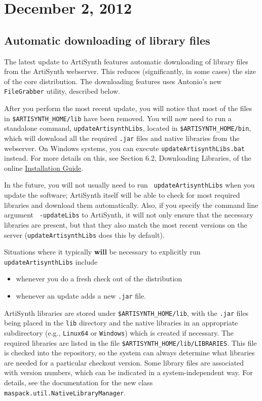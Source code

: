 \documentclass{article}
\begin{document}
\section*{December 2, 2012}

\subsection*{Automatic downloading of library files}

The latest update to ArtiSynth features automatic downloading of
library files from the ArtiSynth webserver. This reduces
(significantly, in some cases) the size of the core distribution.  The
downloading features uses Antonio's new {\tt FileGrabber} utility,
described below.

After you perform the most recent update, you will notice that most of
the files in {\tt \$ARTISYNTH\_HOME/lib} have been removed.  You will
now need to run a standalone command, {\tt updateArtisynthLibs},
located in {\tt \$ARTISYNTH\_HOME/bin}, which will download all the
required {\tt .jar} files and native libraries from the webserver. On
Windows systems, you can execute {\tt updateArtisynthLibs.bat}
instead. For more details on this, see Section 6.2, Downloading
Libraries, of the online 
\href{http://www.artisynth.org/doc/html/installation/installation.html}%
{Installation Guide}.

In the future, you will not usually need to run {\tt
updateArtisynthLibs} when you update the software; ArtiSynth itself
will be able to check for most required libraries and download them
automatically. Also, if you specify the command line argument {\tt
-updateLibs} to ArtiSynth, it will not only ensure that the necessary
libraries are present, but that they also match the most recent
versions on the server ({\tt updateArtisynthLibs} does this by
default).

Situations where it typically {\bf will} be necessary to explicitly
run {\tt updateArtisynthLibs} include

\begin{itemize}

\item whenever you do a fresh check out of the distribution

\item whenever an update adds a new {\tt .jar} file.

\end{itemize}

ArtiSynth libraries are stored under {\tt \$ARTISYNTH\_HOME/lib}, with
the {\tt .jar} files being placed in the {\tt lib} directory and the
native libraries in an appropriate subdirectory (e.g., {\tt Linux64} or
{\tt Windows}) which is created if necessary. The required libraries
are listed in the file {\tt \$ARTISYNTH\_HOME/lib/LIBRARIES}. This
file is checked into the repository, so the system can always
determine what libraries are needed for a particular checkout version.
Some library files are associated with version numbers, which can be
indicated in a system-independent way. For details, see the
documentation for the new class {\tt
maspack.util.NativeLibraryManager}.
\end{document}

